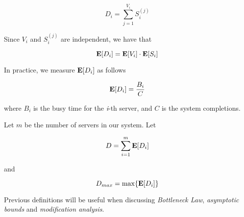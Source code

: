 \begin{equation}
D_{i} = \sum_{j=1}^{V_{i}}S_{i}^{(j)}
\end{equation}

Since $V_{i}$ and $S_{i}^{(j)}$ are independent, we have that

\begin{equation}
\label{eqn:Service-Demand}
\expected{D_{i}} = \expected{V_{i}} \cdot \expected{S_{i}}
\end{equation}

In practice, we measure $\mathbf{E}[D_{i}]$ as follows

\begin{equation}
\mathbf{E}[D_{i}] = \frac{B_{i}}{C} 
\end{equation}

where
$B_{i}$ is the busy time for the \textit{i}-th server, and
$C$ is the system completions.

Let $m$ be the number of servers in our system. Let

\begin{equation}
\label{eqn:Total-Demand}
D = \sum_{i=1}^{m}\expected{D_{i}}
\end{equation}

and

\begin{equation}
\label{eqn:Maximum-Demand}
D_{max} = \max\{\expected{D_{i}}\}
\end{equation}

Previous definitions will be useful when discussing \textit{Bottleneck Law}, \textit{asymptotic bounds} and \textit{modification analysis}.

